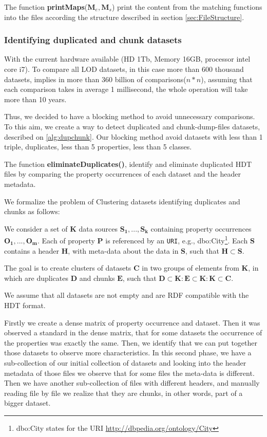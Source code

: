 The function \textbf{printMaps}($\mathbf{M}_e, \mathbf{M}_s$) print the content from the matching functions into the files according the structure described in section \ref{sec:FileStructure}.

\subsubsection{Identifying duplicated and chunk datasets}
\label{sec:duplicates}
With the current hardware available (HD 1Tb, Memory 16GB, processor intel core i7).
To compare all LOD datasets, in this case more than 600 thousand datasets, implies in more than 360 billion of comparisons($n*n$), assuming that each comparison takes in average 1 millisecond, the whole operation will take more than 10 years.

Thus, we decided to have a blocking method to avoid unnecessary comparisons. To this aim, we create a way to detect duplicated and chunk-dump-files datasets, described on \cref{alg:dupchunk}. 
Our blocking method avoid datasets with less than 1 triple, duplicates, less than 5 properties, less than 5 classes.

The function \textbf{eliminateDuplicates()}, identify and eliminate duplicated HDT files by comparing the property occurrences of each dataset and the header metadata.

We formalize the problem of Clustering datasets identifying duplicates and chunks as follows:

We consider a set of $\mathbf{K}$ data sources $\mathbf{S_1}, . . . , \mathbf{S_k}$ containing property occurrences $\mathbf{O_1}, . . . , \mathbf{O_m}$. Each of property $\mathbf{P}$ is referenced by an \texttt{URI}, e.g., dbo:City\footnote{dbo:City states for the URI \url{http://dbpedia.org/ontology/City}}. Each $\mathbf{S}$ contains a header $\mathbf{H}$, with meta-data about the data in $\mathbf{S}$, such that $\mathbf{H} \subset \mathbf{S}$.

The goal is to create clusters of datasets $\mathbf{C}$ in two groups of elements from $\mathbf{K}$, in which are duplicates $\mathbf{D}$ and chunks $\mathbf{E}$, such that $\mathbf{D} \subset \mathbf{K} : \mathbf{E} \subset \mathbf{K} : \mathbf{K} \subset \mathbf{C}$.

We assume that all datasets are not empty and are RDF compatible with the HDT format.

Firstly we create a dense matrix of property occurrence and dataset. Then it was observed a standard in the dense matrix, that for some datasets the occurrence of the properties was exactly the same. Then, we identify that we can put together those datasets to observe more characteristics.
In this second phase, we have a sub-collection of our initial collection of datasets and looking into the header metadata of those files we observe that for some files the meta-data is different. Then we have another sub-collection of files with different headers, and manually reading file by file we realize that they are chunks, in other words, part of a bigger dataset. 

